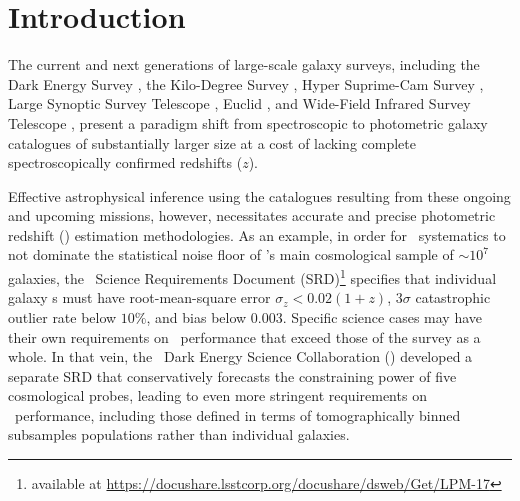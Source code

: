 \section{Introduction}
\label{sec:intro}

The current and next generations of large-scale galaxy surveys, including the Dark Energy Survey \citep[,][]{Abbott:05}, the Kilo-Degree Survey \citep[,][]{de_Jong:13}, Hyper Suprime-Cam Survey \citep[,][]{Aihara:2018a,Aihara:2018b}, Large Synoptic Survey Telescope \citep[\lsst,][]{Abell:09}, Euclid \citep{Laureijs:11}, and Wide-Field Infrared Survey Telescope \citep[,][]{Green:12}, present a paradigm shift from spectroscopic to photometric galaxy catalogues of substantially larger size at a cost of lacking complete spectroscopically confirmed redshifts ($z$).

Effective astrophysical inference using the catalogues resulting from these ongoing and upcoming missions, however, necessitates accurate and precise photometric redshift (\pz) estimation methodologies.
As an example, in order for \pz\ systematics to not dominate the statistical noise floor of \lsst's main cosmological sample of $\sim 10^{7}$ galaxies, the \lsst\ Science Requirements Document (SRD)\footnote{available at \url{https://docushare.lsstcorp.org/docushare/dsweb/Get/LPM-17}} specifies that individual galaxy \pz s must have root-mean-square error $\sigma_z < 0.02 (1+z)$, $3 \sigma$ catastrophic outlier rate below $10\%$, and bias below $0.003$.
Specific science cases may have their own requirements on \pz\ performance that exceed those of the survey as a whole.
In that vein, the \lsst\ Dark Energy Science Collaboration (\lsstdesc) developed a separate SRD \citep{Mandelbaum:2018} that conservatively forecasts the constraining power of five cosmological probes, leading to even more stringent requirements on \pz\ performance, including those defined in terms of tomographically binned subsamples populations rather than individual galaxies.

